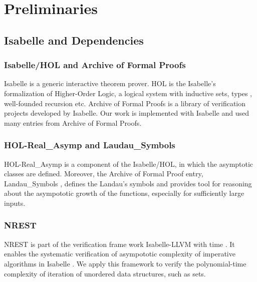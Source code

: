 \newcommand{\red}{\leq_p}
\newcommand{\problem}[3]{
\begin{definition}
    {#1} \\
    \textbf{Input}: {#2}\\
    \textbf{Output}: {#3}
\end{definition}
}
\newcommand{\bigO}[1]{\mathcal{O}({#1})}

\chapter{Preliminaries}\label{chapter:preliminaries}
\section{Isabelle and Dependencies}
\subsection*{Isabelle/HOL and Archive of Formal Proofs}
Isabelle \cite{wenzel2004isabelle} is a generic interactive theorem prover. HOL is the Isabelle's formalization of Higher-Order Logic, 
a logical system with inductive sets, types , well-founded recursion etc. 
Archive of Formal Proofs \cite{AFP} is a library of verification projects developed by Isabelle. 
Our work is implemented with Isabelle and used many entries from Archive of Formal 
Proofs.

\subsection*{HOL-Real\_Asymp and Laudau\_Symbols}
HOL-Real\_Asymp is a component of the Isabelle/HOL, in which the asymptotic 
classes are defined. Moreover, the Archive of Formal Proof entry, Landau\_Symbols \cite{Landau_Symbols-AFP}, 
defines the Landau's symbols and provides tool for reasoning about the asympototic
growth of the functions, especially for sufficiently large inputs. 

\subsection*{NREST}
NREST is part of the verification frame work Isabelle-LLVM with time \cite{haslbeck2021verified}. It enables 
the systematic verification of asympototic complexity of imperative algorithms in Isabelle \cite{zhan2018verifying}. 
We apply this framework 
to verify the polynomial-time complexity of iteration of unordered data structures, such as sets.


